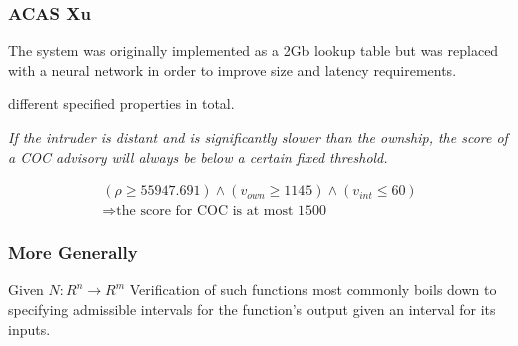\documentclass{beamer}
\begin{document}
\begin{frame}
\frametitle{ACAS Xu}
The system was originally implemented as a 2Gb lookup table but was replaced with a neural network in order to improve size and latency requirements.

 different specified properties in total.

\pause
\begin{definition}
\emph{If the intruder is distant and is significantly slower than the ownship, the score of a COC advisory will always be below a certain fixed threshold.}
\end{definition}

\pause
\begin{block}{}
\begin{equation*}
\begin{array}{l}
(\rho \geq 55947.691) \wedge 
(v_{own} \geq 1145) \wedge (v_{int} \leq 60)  \\
\Rightarrow \text{the score for COC is at most 1500}
\end{array}
\end{equation*}
\end{block}

\end{frame}
    
    \begin{frame}
    \frametitle{More Generally}
    
    \begin{block}{Given $N : R^n \rightarrow R^m$} 
    Verification of such functions most commonly boils down to specifying admissible intervals for the function's output given an interval for its inputs.
\end{block}

    \end{frame}
\end{document}
